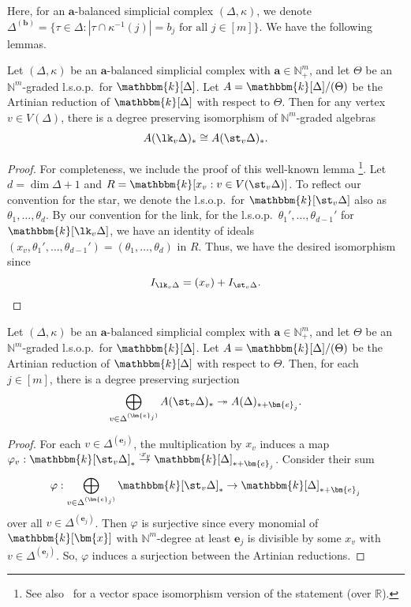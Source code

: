 Here, for an $\bm{a}$-balanced simplicial complex $(\Delta,\kappa)$, we denote $\Delta^{(\bm{b})}=\{\tau\in\Delta:|\tau \cap \kappa^{-1}(j)|=b_j \text{ for all }j\in [m]\}$.
We have the following lemmas.
\begin{lemma} \label{lem:cone}
Let $(\Delta,\kappa)$ be an $\bm{a}$-balanced simplicial complex with $\bm{a}\in\mathbb{N}_+^m$, and let $\Theta$ be an $\mathbb{N}^m$-graded l.s.o.p.~for $\mathbbm{k}[\Delta]$.
Let $A=\mathbbm{k}[\Delta]/(\Theta)$ be the Artinian reduction of $\mathbbm{k}[\Delta]$ with respect to $\Theta$.
Then for any vertex $v \in V(\Delta)$, there is a degree preserving isomorphism of $\mathbb{N}^m$-graded algebras
\[
A(\lk_v \Delta)_{*} \cong A(\st_v \Delta)_{*}.
\]
\end{lemma}
\begin{proof}
For completeness, we include the proof of this well-known lemma \footnote{See also~\cite[Theorem 7]{Lee} for a vector space isomorphism version of the statement (over $\mathbb{R}$).}.
Let $d=\dim \Delta+1$ and $R=\mathbbm{k}[x_v:v \in V(\st_v\Delta)]$.
To reflect our convention for the star, we denote the l.s.o.p.~for $\mathbbm{k}[\st_v \Delta]$ also as $\theta_1,\ldots,\theta_d$.
By our convention for the link, for the l.s.o.p.~$\theta_1', \ldots, \theta_{d-1}'$ for $\mathbbm{k}[\lk_v \Delta]$, we have an identity of ideals $(x_v,\theta_1',\ldots,\theta_{d-1}')=(\theta_1,\ldots,\theta_d)$ in $R$.
Thus, we have the desired isomorphism since \[I_{\lk_v \Delta} = (x_v) + I_{\st_v \Delta}. \qedhere\]
\end{proof}
\begin{lemma} \label{lem:partition}
Let $(\Delta,\kappa)$ be an $\bm{a}$-balanced simplicial complex with $\bm{a}\in\mathbb{N}_+^m$, and let $\Theta$ be an $\mathbb{N}^m$-graded l.s.o.p.~for $\mathbbm{k}[\Delta]$.
Let $A=\mathbbm{k}[\Delta]/(\Theta)$ be the Artinian reduction of $\mathbbm{k}[\Delta]$ with respect to $\Theta$.
Then, for each $j \in [m]$, there is a degree preserving surjection 
\[
\bigoplus_{v \in \Delta^{(\bm{e}_j)}} A(\st_v \Delta)_{*} \twoheadrightarrow A(\Delta)_{*+\bm{e}_j}.
\]
\end{lemma}
\begin{proof}
For each $v \in \Delta^{(\bm{e}_j)}$, the multiplication by $x_v$ induces a map $\varphi_v: \mathbbm{k}[\st_v \Delta]_* \overset{\cdot x_v}{\rightarrow} \mathbbm{k}[\Delta]_{*+\bm{e}_j}$. Consider their sum
\[
\varphi:\bigoplus_{v \in \Delta^{(\bm{e}_j)}} \mathbbm{k}[\st_v \Delta]_* \rightarrow \mathbbm{k}[\Delta]_{*+\bm{e}_j}
\]
over all $v \in \Delta^{(\bm{e}_j)}$.
Then $\varphi$ is surjective since every monomial of $\mathbbm{k}[\bm{x}]$ with $\mathbb{N}^m$-degree at least $\bm{e}_j$ is divisible by some $x_v$ with $v \in \Delta^{(\bm{e}_j)}$.
So, $\varphi$ induces a surjection between the Artinian reductions.
\end{proof}
